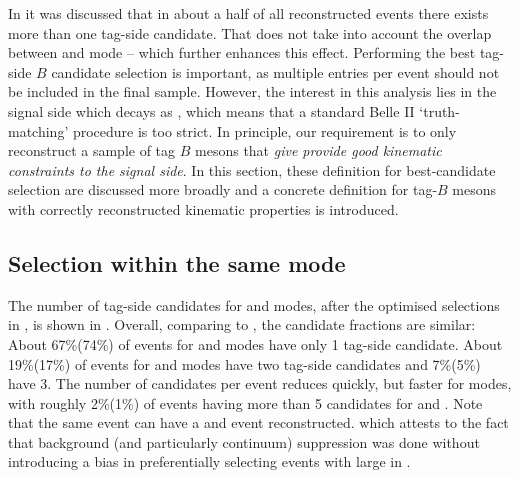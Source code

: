 In  it was discussed that in about a half of all reconstructed events there exists more than one tag-side candidate.
That does not take into account the overlap between \feiBp and \feiBz mode -- which further enhances this effect.
Performing the best tag-side $B$ candidate selection is important, as multiple entries per event should not be included in the final sample.
However, the interest in this analysis lies in the signal side which decays as \BtoXsgamma, which means that a standard Belle II `truth-matching' procedure is too strict.
In principle, our requirement is to only reconstruct a sample of tag $B$ mesons that \textit{give provide good kinematic constraints to the signal side}.
In this section, these definition for best-candidate selection are discussed more broadly and
 a concrete definition for tag-$B$ mesons with correctly reconstructed kinematic properties is introduced.

\subsection{Selection within the same \texorpdfstring{\FEI}{FEI} mode}\label{sec:select_tag_between_modes}

The number of tag-side candidates for \feiBp and \feiBz modes, after the optimised selections in ,
is shown in .
Overall, comparing to , the candidate fractions are similar:
About 67\%(74\%) of events for \feiBp and \feiBz modes have only 1 tag-side candidate.
About 19\%(17\%) of events for \feiBp and \feiBz modes have two tag-side candidates and 7\%(5\%) have 3.
The number of candidates per event reduces quickly, but faster for \Bz modes, 
with roughly 2\%(1\%) of events having more than 5 candidates for \Bp and \Bz.
Note that the same event can have a \Bp and \Bz event reconstructed.
which attests to the fact that background (and particularly continuum) suppression was done without introducing a bias in preferentially selecting events with large \feiProb in .

